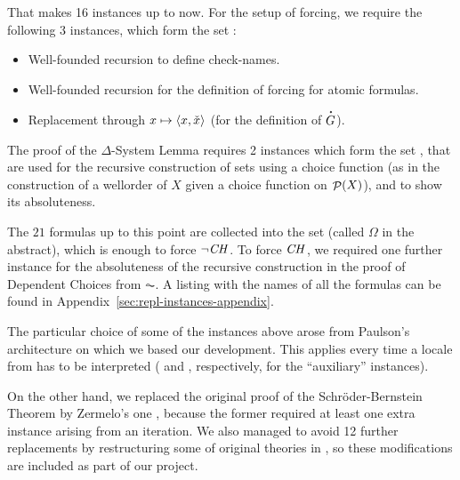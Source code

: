 That makes 16 instances up to now. For the setup of forcing, we
require the following 3 instances, which form the set
:
%
\begin{itemize}
\item Well-founded recursion to define check-names.
\item Well-founded recursion for the definition of forcing for atomic formulas.
\item Replacement through $x\mapsto \langle x,\check{x}\rangle$ (for the
  definition of $\punto{G}$).
\end{itemize}
The proof of the $\Delta$-System Lemma requires 2 instances which form the set
, that are
used for the recursive construction of sets using a choice function (as in the
construction of a wellorder of $X$ given a choice function on
$\mathop{\mathcal{P}}(X)$), and to show its absoluteness.

The $21$ formulas up to this point are collected into the set
 (called $\Omega$ in the abstract), which is enough to
force $\neg\mathit{CH}$. To force $\mathit{CH}$, we required one further instance for
the absoluteness of the recursive construction in the proof of
Dependent Choices from $\AC$. A listing with the names of all the formulas
can be found in Appendix~\ref{sec:repl-instances-appendix}.
  
The particular choice of some of the instances above arose from
Paulson's architecture on which we based our development.
This applies every time
a locale from  has to be
interpreted ( and
, respectively, for the “auxiliary” instances).

On the other hand, we replaced the original proof of the
Schröder-Bernstein Theorem by Zermelo's one
\cite[Exr. x4.27]{moschovakis1994notes}, because the former required
at least one extra instance
arising from an iteration. We also managed to avoid 12 further
replacements by restructuring some of original theories in
, so these modifications are included as
part of our project.

